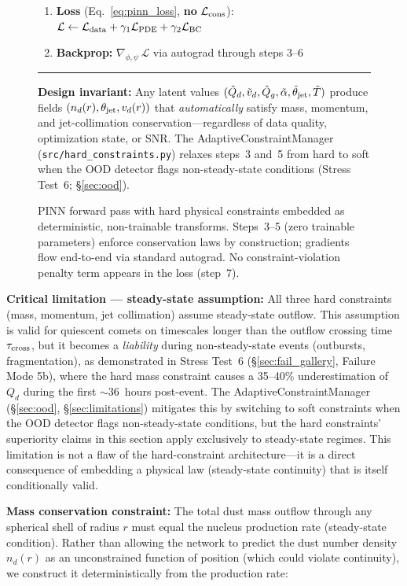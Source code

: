 \documentclass[usenatbib]{mnras}
\begin{document}
\begin{figure}[htbp]
{\begin{minipage}{0.94\textwidth}
\begin{enumerate}
    \item[\textbf{7.}] \textbf{Loss} (Eq.~\ref{eq:pinn_loss}, \textbf{no} $\mathcal{L}_{\rm cons}$): $\mathcal{L} \leftarrow \mathcal{L}_{\rm data} + \gamma_1 \mathcal{L}_{\rm PDE} + \gamma_2 \mathcal{L}_{\rm BC}$
    \item[\textbf{8.}] \textbf{Backprop:} $\nabla_{\phi,\psi}\,\mathcal{L}$ via autograd through steps 3--6
\end{enumerate}
\rule{\linewidth}{0.3pt}
\textbf{Design invariant:} Any latent values $(\tilde{Q}_d, \tilde{v}_d, \tilde{Q}_g, \tilde{\alpha}, \tilde{\theta}_{\rm jet}, \tilde{T})$ produce fields $(n_d(r), \theta_{\rm jet}, v_d(r))$ that \textit{automatically} satisfy mass, momentum, and jet-collimation conservation---regardless of data quality, optimization state, or SNR. The AdaptiveConstraintManager (\texttt{src/hard\_constraints.py}) relaxes steps~3 and~5 from hard to soft when the OOD detector flags non-steady-state conditions (Stress Test~6; \S\ref{sec:ood}).
\end{minipage}
}
\caption{PINN forward pass with hard physical constraints embedded as deterministic, non-trainable transforms. Steps~3--5 (zero trainable parameters) enforce conservation laws by construction; gradients flow end-to-end via standard autograd. No constraint-violation penalty term appears in the loss (step~7).}\label{alg:hard_constraints}
\end{figure}

\textbf{Critical limitation --- steady-state assumption:} All three hard constraints (mass, momentum, jet collimation) assume steady-state outflow. This assumption is valid for quiescent comets on timescales longer than the outflow crossing time $\tau_{\rm cross}$, but it becomes a \textit{liability} during non-steady-state events (outbursts, fragmentation), as demonstrated in Stress Test~6 (\S\ref{sec:fail_gallery}, Failure Mode 5b), where the hard mass constraint causes a 35--40\% underestimation of $Q_d$ during the first $\sim$36~hours post-event. The AdaptiveConstraintManager (\S\ref{sec:ood}, \S\ref{sec:limitations}) mitigates this by switching to soft constraints when the OOD detector flags non-steady-state conditions, but the hard constraints' superiority claims in this section apply exclusively to steady-state regimes. This limitation is not a flaw of the hard-constraint architecture---it is a direct consequence of embedding a physical law (steady-state continuity) that is itself conditionally valid.

\textbf{Mass conservation constraint:} The total dust mass outflow through any spherical shell of radius $r$ must equal the nucleus production rate (steady-state condition). Rather than allowing the network to predict the dust number density $n_d(r)$ as an unconstrained function of position (which could violate continuity), we construct it deterministically from the production rate:
\end{document}
